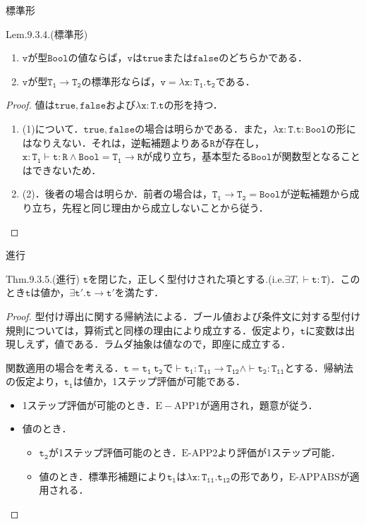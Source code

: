 \documentclass[9pt]{beamer}
\begin{document}
\begin{frame}{標準形}
\begin{alertblock}{Lem.9.3.4.(標準形)}
\begin{enumerate}
\item $\mathtt{v}$が型$\mathtt{Bool}$の値ならば，$\mathtt{v}$は$\mathtt{true}$または$\mathtt{false}$のどちらかである．
\item $\mathtt{v}$が型$\mathtt{T_{1}\rightarrow T_{2}}$の標準形ならば，$\mathtt{v= \lambda x:T_{1}.t_{2}}$である．
\end{enumerate}
\end{alertblock}
\begin{proof}
値は$\mathtt{true,false}$および$\mathtt{\lambda x: T.t}$の形を持つ．\begin{enumerate}
\item (1)について．$\mathtt{true, false}$の場合は明らかである．また，$\mathtt{\lambda x:T. t:Bool}$の形にはなりえない．それは，逆転補題よりある$\mathtt{R}$が存在し，$\mathtt{x:T_{1}\vdash t:R}\land \mathtt{Bool = T_{1}\rightarrow R}$が成り立ち，基本型たる$\mathtt{Bool}$が関数型となることはできないため．
\item (2)．後者の場合は明らか．前者の場合は，$\mathtt{T_{1}\rightarrow T_{2} = Bool}$が逆転補題から成り立ち，先程と同じ理由から成立しないことから従う．
\end{enumerate}
\end{proof}
\end{frame}
\begin{frame}{進行}
\begin{dblock}{Thm.9.3.5.(進行)}
$\mathtt{t}$を閉じた，正しく型付けされた項とする.(i.e.$\exists T, \mathtt{\vdash t:T}$)．このとき$\mathtt{t}$は値か，$\mathtt{\exists t'. t\rightarrow t'}$を満たす．
\end{dblock}
\begin{proof}
型付け導出に関する帰納法による．ブール値および条件文に対する型付け規則については，算術式と同様の理由により成立する．仮定より，$\mathtt{t}$に変数は出現しえず，値である．ラムダ抽象は値なので，即座に成立する．

関数適用の場合を考える．$\mathtt{t = t_{1}\ t_{2}}$で$\vdash\mathtt{t_{1}:T_{11}\rightarrow T_{12}}\land \vdash \mathtt{t_{2}:T_{11}}$とする．帰納法の仮定より，$\mathtt{t_{1}}$は値か，1ステップ評価が可能である．\begin{itemize}
	\item 1ステップ評価が可能のとき．$\mathrm{E}-\mathrm{APP1}$が適用され，題意が従う．
	\item 値のとき．\begin{itemize}
	\item $\mathtt{t_{2}}$が1ステップ評価可能のとき．$\mathrm{E}$-$\mathrm{APP2}$より評価が1ステップ可能．
	\item 値のとき．標準形補題により$\mathtt{t_{1}}$は$\mathtt{\lambda x:T_{11}.t_{12}}$の形であり，$\mathrm{E}$-$\mathrm{APPABS}$が適用される．
	\end{itemize}
\end{itemize}
\end{proof}
\end{frame}
\end{document}
